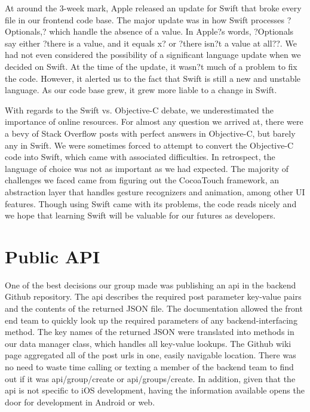 \documentclass[12pt]{article}
\begin{document}
\bigskip

At around the 3-week mark, Apple released an update for Swift that broke every file in our frontend code base. The major update was in how Swift processes ?Optionals,? which handle the absence of a value. In Apple?s words, ?Optionals say either ?there is a value, and it equals x? or ?there isn?t a value at all??. We had not even considered the possibility of a significant language update when we decided on Swift. At the time of the update, it wasn?t much of a problem to fix the code. However, it alerted us to the fact that Swift is still a new and unstable language. As our code base grew, it grew more liable to a change in Swift.

\bigskip

With regards to the Swift vs. Objective-C debate, we underestimated the importance of online resources. For almost any question we arrived at, there were a bevy of Stack Overflow posts with perfect answers in Objective-C, but barely any in Swift. We were sometimes forced to attempt to convert the Objective-C code into Swift, which came with associated difficulties. In retrospect, the language of choice was not as important as we had expected. The majority of challenges we faced came from figuring out the CocoaTouch framework, an abstraction layer that handles gesture recognizers and animation, among other UI features. Though using Swift came with its problems, the code reads nicely and we hope that learning Swift will be valuable for our futures as developers.

\bigskip

\section{Public API}
One of the best decisions our group made was publishing an api in the backend Github repository. The api describes the required post parameter key-value pairs and the contents of the returned JSON file. The documentation allowed the front end team to quickly look up the required parameters of any backend-interfacing method. The key names of the returned JSON were translated into methods in our data manager class, which handles all key-value lookups. The Github wiki page aggregated all of the post urls in one, easily navigable location. There was no need to waste time calling or texting a member of the backend team to find out if it was api/group/create or api/groups/create. In addition, given that the api is not specific to iOS development, having the information available opens the door for development in Android or web.
\end{document}
